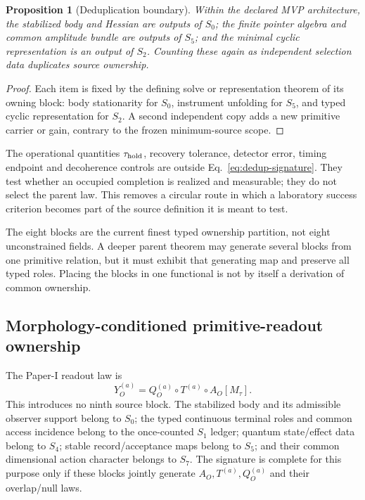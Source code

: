 \documentclass[11pt]{article}
\newtheorem{proposition}{Proposition}
\begin{document}
\begin{proposition}[Deduplication boundary]
Within the declared MVP architecture, the stabilized body and Hessian are
outputs of \(S_0\); the finite pointer algebra and common amplitude bundle are
outputs of \(S_5\); and the minimal cyclic representation is an output of
\(S_2\). Counting these again as independent selection data duplicates source
ownership.
\end{proposition}

\begin{proof}
Each item is fixed by the defining solve or representation theorem of its
owning block: body stationarity for \(S_0\), instrument unfolding for \(S_5\),
and typed cyclic representation for \(S_2\). A second independent copy adds a
new primitive carrier or gain, contrary to the frozen minimum-source scope.
\end{proof}

The operational quantities \(\tau_{\rm hold}\), recovery tolerance, detector
error, timing endpoint and decoherence controls are outside
Eq.~\eqref{eq:dedup-signature}. They test whether an occupied completion is
realized and measurable; they do not select the parent law. This removes a
circular route in which a laboratory success criterion becomes part of the
source definition it is meant to test.

The eight blocks are the current finest typed ownership partition, not eight
unconstrained fields. A deeper parent theorem may generate several blocks from
one primitive relation, but it must exhibit that generating map and preserve
all typed roles. Placing the blocks in one functional is not by itself a
derivation of common ownership.

\subsection{Morphology-conditioned primitive-readout ownership}

The Paper-I readout law is
\begin{equation}
 Y_O^{(a)}=Q_O^{(a)}\circ T^{(a)}\circ A_O[M_\tau].
 \label{eq:mcpr-selection-interface}
\end{equation}
This introduces no ninth source block. The stabilized body and its admissible
observer support belong to $S_0$; the typed continuous terminal roles and
common access incidence belong to the once-counted $S_1$ ledger; quantum
state/effect data belong to $S_4$; stable record/acceptance maps belong to
$S_5$; and their common dimensional action character belongs to $S_7$.
The signature is complete for this purpose only if these blocks jointly
generate $A_O,T^{(a)},Q_O^{(a)}$ and their overlap/null laws.
\end{document}
